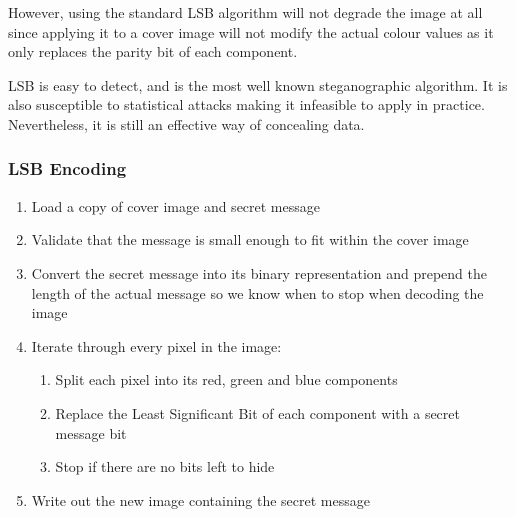 \documentclass[11pt,letterpaper]{article}
\begin{document}
However, using the standard LSB algorithm will not degrade the image at all since applying it to a cover image will not modify the actual colour values as it only replaces the parity bit of each component. 

LSB is easy to detect, and is the most well known steganographic algorithm. It is also susceptible to statistical attacks making it infeasible to apply in practice. Nevertheless, it is still an effective way of concealing data.

\subsubsection{LSB Encoding}
\begin{enumerate}
\setlength\itemsep{0pt}
\item Load a copy of cover image and secret message
\item Validate that the message is small enough to fit within the cover image
\item Convert the secret message into its binary representation and prepend the length of the actual message so we know when to stop when decoding the image
\item Iterate through every pixel in the image:
\begin{enumerate}
	\setlength\itemsep{0pt}
	\item Split each pixel into its red, green and blue components
	\item Replace the Least Significant Bit of each component with a secret message bit
	\item Stop if there are no bits left to hide
\end{enumerate}
\item Write out the new image containing the secret message
\end{enumerate}
\end{document}
